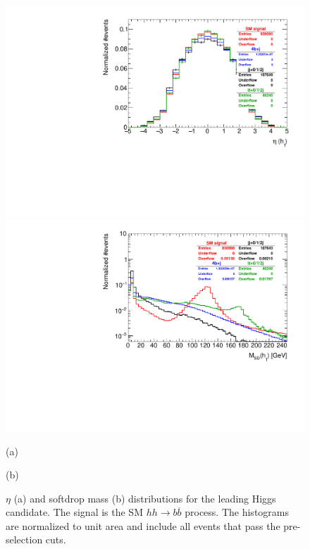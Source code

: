 \begin{figure}
	\centering
	\begin{minipage}{.5\textwidth}
		\centering
		\includegraphics[trim={.65cm 0 0 0},clip,width=\linewidth]{./Figures/hist_h1_eta.pdf}
	\end{minipage}%
	\begin{minipage}{.5\textwidth}
		\centering
		\includegraphics[trim={0 0 .65cm 0},clip,width=\linewidth]{./Figures/hist_h1_softdrop_M.pdf}
	\end{minipage}
	\begin{minipage}[t]{0.5\textwidth}
		\caption*{(a)}
	\end{minipage}%
	\hfill
	\begin{minipage}[t]{0.5\textwidth}
		\caption*{(b)}
	\end{minipage}
	\caption{$\eta$ (a) and softdrop mass (b) distributions for the leading Higgs candidate. The signal is the SM $hh\rightarrow b\overline{b}$ process. The histograms are normalized to unit area and include all events that pass the pre-selection cuts.}
	\label{fig:h1_eta_M}
\end{figure}	

